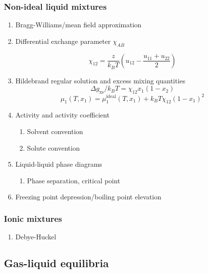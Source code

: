 \documentclass[11pt]{article}
\begin{document}
\subsubsection{Non-ideal liquid mixtures}
\label{sec:org9e283a8}
\begin{enumerate}
\item Bragg-Williams/mean field approximation
\item Differential exchange parameter \(\chi_{AB}\)

\begin{equation*}
   \chi_{12} = \frac{z}{k_BT}\left ( u_{12} - \frac{u_\text{11} +
    u_\text{22}}{2} \right )
\end{equation*}

\item Hildebrand regular solution and excess mixing quantities
\begin{equation*}
   \Delta g_\text{xs}/k_BT = \chi_{12} x_1(1-x_2)
\end{equation*}
\begin{equation*}
    \mu_1(T,x_1) = \mu_1^\text{ideal}(T,x_1) + k_B T \chi_{12} (1-x_1)^2
\end{equation*}
\item Activity and activity coefficient
\begin{enumerate}
\item Solvent convention
\item Solute convention
\end{enumerate}
\item Liquid-liquid phase diagrams
\begin{enumerate}
\item Phase separation, critical point
\end{enumerate}
\item Freezing point depression/boiling point elevation
\end{enumerate}
\subsubsection{Ionic mixtures}
\label{sec:org544c83f}
\begin{enumerate}
\item Debye-Huckel
\end{enumerate}

\subsection{Gas-liquid equilibria}
\label{sec:orgbff71ed}
\end{document}
